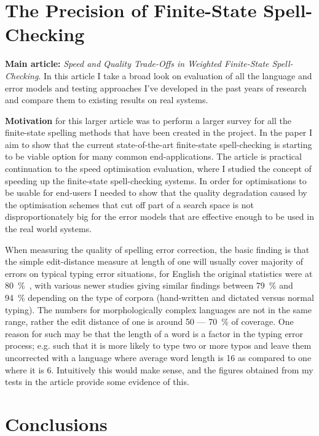 \documentclass[officiallayout]{unihelcompling}
\begin{document}
\section{The Precision of Finite-State Spell-Checking}

\textbf{Main article:} \emph{Speed and Quality Trade-Offs in Weighted
Finite-State Spell-Checking}. In this article I take a broad look on evaluation
of all the language and error models and testing approaches I've developed in
the past years of research and compare them to existing results on real
systems.

\textbf{Motivation} for this larger article was to perform a larger survey
for all the finite-state spelling methods that have been created in the
project. In the paper I aim to show that the current state-of-the-art
finite-state spell-checking is starting to be viable option for many
common end-applications. The article is practical continuation to the speed
optimisation evaluation, where I studied the concept of speeding up the
finite-state spell-checking systems. In order for optimisations to be usable
for end-users I needed to show that the quality degradation caused by the
optimisation schemes that cut off part of a search space is not 
disproportionately big for the error models that are effective enough to be
used in the real world systems.

When measuring the quality of spelling error correction, the basic finding is
that the simple edit-distance measure at length of one will usually cover
majority of errors on typical typing error situations, for English the 
original statistics were at 80~\%~\citep{damerau1964technique}, with various
newer studies giving similar findings between 79~\% and 94~\% depending on
the type of corpora (hand-written and dictated versus normal typing).
The numbers for morphologically complex languages are not in the same range,
rather the edit distance of one is around 50 --- 70~\% of coverage. One
reason for such may be that the length of a word is a factor in the typing
error process; e.g. such that it is more likely to type two or more typos
and leave them uncorrected with a language where average word length is 16
as compared to one where it is 6. Intuitively this would make sense, and the
figures obtained from my tests in the article provide some evidence of this.

\section{Conclusions}
\end{document}
